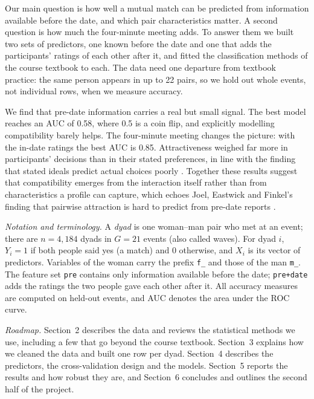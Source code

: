 Our main question is how well a mutual match can be predicted from information available before the date, and which
pair characteristics matter. A second question is how much the four-minute meeting adds. To answer them we built two
sets of predictors, one known before the date and one that adds the participants' ratings of each other after it,
and fitted the classification methods of the course textbook to each. The data need one departure from textbook
practice: the same person appears in up to 22 pairs, so we hold out whole events, not individual rows, when we
measure accuracy.

We find that pre-date information carries a real but small signal. The best model reaches an AUC of 0.58, where 0.5 is
a coin flip, and explicitly modelling compatibility barely helps. The four-minute meeting changes the picture: with
the in-date ratings the best AUC is 0.85. Attractiveness weighed far more in participants' decisions than in their
stated preferences, in line with the finding that stated ideals predict actual choices poorly \cite{Eastwick:2008}. Together these results suggest that compatibility emerges from the
interaction itself rather than from characteristics a profile can capture, which echoes Joel, Eastwick and Finkel's
finding that pairwise attraction is hard to predict from pre-date reports \cite{Joel:2017}.

\emph{Notation and terminology.} A \emph{dyad} is one woman--man pair who met at an event; there are $n=4{,}184$ dyads in
$G=21$ events (also called waves). For dyad $i$, $Y_i=1$ if both people said yes (a match) and $0$ otherwise, and $X_i$
is its vector of predictors. Variables of the woman carry the prefix \texttt{f\_} and those of the man \texttt{m\_}.
The feature set \texttt{pre} contains only information available before the date; \texttt{pre+date} adds the ratings
the two people gave each other after it. All accuracy measures are computed on held-out events, and AUC denotes the
area under the ROC curve.

\emph{Roadmap.} Section~2 describes the data and reviews the statistical methods we use, including a few that go
beyond the course textbook. Section~3 explains how we cleaned the data and built one row per dyad. Section~4 describes
the predictors, the cross-validation design and the models. Section~5 reports the results and how robust they are,
and Section~6 concludes and outlines the second half of the project.

